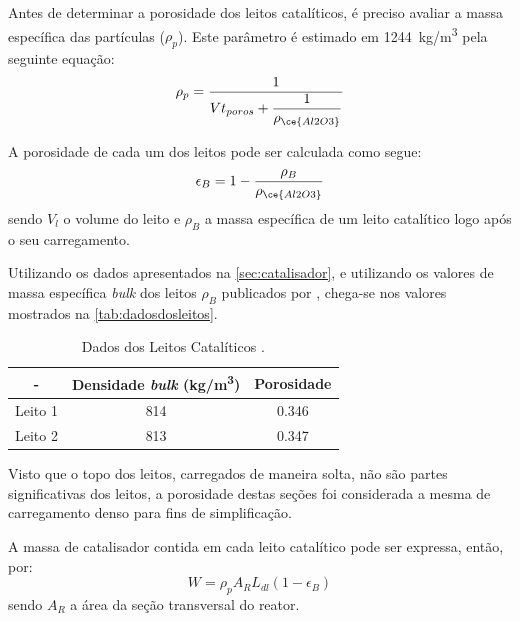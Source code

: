Antes de determinar a porosidade dos leitos catalíticos, é preciso avaliar a
massa específica das partículas ($\rho_{p}$). Este parâmetro é estimado em
\SI{1244}{kg/m^3} pela seguinte equação:
\begin{equation}
\rho_{p} = \dfrac{1}{Vt_{poros}+\dfrac{1}{\rho_{\ce{Al2O3}}}}
\label{eq:rhoparticula}
\end{equation}


A porosidade de cada um dos leitos pode ser calculada como segue:
\begin{equation}
\epsilon_{B} = {1 - \dfrac{\rho_{B}}{\rho_{\ce{Al2O3}}}}
\label{eq:porosidade}
\end{equation}
sendo $V_l$ o volume do leito e $\rho_B$ a massa específica de um leito
catalítico logo após o seu carregamento.

Utilizando os dados apresentados na \autoref{sec:catalisador}, e utilizando os
valores de massa específica \emph{bulk} dos leitos $\rho_{B}$ publicados por
, chega-se nos valores mostrados na
\autoref{tab:dadosdosleitos}.

\begin{table}[!htb]
\begin{center}
\caption{Dados dos Leitos Catalíticos \cite{Rojas2014a}.}
\label{tab:dadosdosleitos}
\small
\begin{tabular}{ccc}
{ - } & {Densidade \emph{bulk} (\si{kg/m^3})} & {Porosidade} 
\\
\hline
{Leito 1} & \num{814} & \num{0,346} \\
{Leito 2} & \num{813} & \num{0,347} \\
\bottomrule
\end{tabular}
\end{center}
\end{table}

Visto que o topo dos leitos, carregados de maneira solta, não são partes
significativas dos leitos, a porosidade destas seções foi
considerada a mesma de carregamento denso para fins de simplificação. 

A massa de catalisador contida em cada leito catalítico pode ser expressa,
então, por:
\begin{equation}
W = \rho_pA_RL_{dl}(1-\epsilon_{B})
\label{eq:massacatalisador}
\end{equation}
sendo $A_R$ a área da seção transversal do reator.

